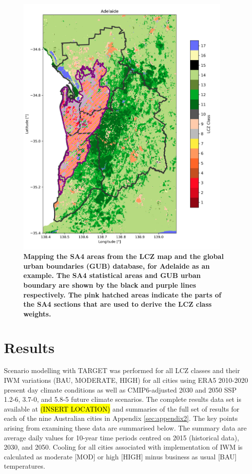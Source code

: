 \documentclass[utf8]{frontiersSCNS} %
\begin{document}
\begin{figure}[!h]
\centering
\includegraphics[width=0.95\textwidth]{images/image7.jpg}
\caption{\bf Mapping the SA4 areas from the LCZ map and the global urban boundaries (GUB) database, for Adelaide as an example. The SA4 statistical areas and GUB urban boundary are shown by the black and purple lines respectively. The pink hatched areas indicate the parts of the SA4 sections that are used to derive the LCZ class weights.}
 \label{fig:sa4maps}
\end{figure}

\section{Results}\label{sec:results}

Scenario modelling with TARGET was performed for all LCZ classes and their IWM variations (BAU, MODERATE, HIGH) for all cities using ERA5 2010-2020 present day climate conditions as well as CMIP6-adjusted 2030 and 2050 SSP 1.2-6, 3.7-0, and 5.8-5 future climate scenarios. The complete results data set is available at \hl{(INSERT LOCATION)} and summaries of the full set of results for each of the nine Australian cities in Appendix \ref{sec:appendix2}. The key points arising from examining these data are summarised below. The summary data are average daily values for 10-year time periods centred on 2015 (historical data), 2030, and 2050. Cooling for all cities associated with implementation of IWM is calculated as moderate [MOD] or high [HIGH] minus business as usual [BAU] temperatures.
\end{document}
